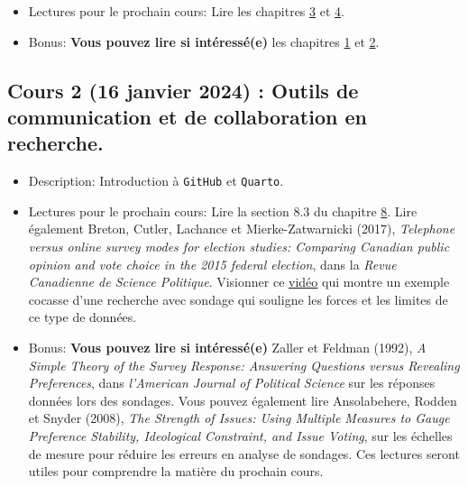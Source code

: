 \documentclass[
  letterpaper,
  DIV=11,
  numbers=noendperiod]{scrartcl}
\begin{document}
\begin{itemize}
\item
  Lectures pour le prochain cours: Lire les chapitres
  \href{https://tellingstorieswithdata.com/03-workflow.html}{3} et
  \href{https://tellingstorieswithdata.com/04-writing_research.html}{4}.
\item
  Bonus: \textbf{Vous pouvez lire si intéressé(e)} les chapitres
  \href{https://tellingstorieswithdata.com/01-introduction.html}{1} et
  \href{https://tellingstorieswithdata.com/02-drinking_from_a_fire_hose.html}{2}.
\end{itemize}

\subsection{Cours 2 (16 janvier 2024) : Outils de communication et de
collaboration en
recherche.}\label{cours-2-16-janvier-2024-outils-de-communication-et-de-collaboration-en-recherche.}

\begin{itemize}
\item
  Description: Introduction à \texttt{GitHub} et \texttt{Quarto}.
\item
  Lectures pour le prochain cours: Lire la section 8.3 du chapitre
  \href{https://tellingstorieswithdata.com/08-hunt.html}{8}. Lire
  également Breton, Cutler, Lachance et Mierke-Zatwarnicki (2017),
  \emph{Telephone versus online survey modes for election studies:
  Comparing Canadian public opinion and vote choice in the 2015 federal
  election}, dans la \emph{Revue Canadienne de Science Politique}.
  Visionner ce
  \href{https://www.youtube.com/watch?app=desktop&v=5SybR3KiBMw&ab_channel=TLDRBusiness}{vidéo}
  qui montre un exemple cocasse d'une recherche avec sondage qui
  souligne les forces et les limites de ce type de données.
\item
  Bonus: \textbf{Vous pouvez lire si intéressé(e)} Zaller et Feldman
  (1992), \emph{A Simple Theory of the Survey Response: Answering
  Questions versus Revealing Preferences}, dans \emph{l'American Journal
  of Political Science} sur les réponses données lors des sondages. Vous
  pouvez également lire Ansolabehere, Rodden et Snyder (2008), \emph{The
  Strength of Issues: Using Multiple Measures to Gauge Preference
  Stability, Ideological Constraint, and Issue Voting}, sur les échelles
  de mesure pour réduire les erreurs en analyse de sondages. Ces
  lectures seront utiles pour comprendre la matière du prochain cours.
\end{itemize}
\end{document}
